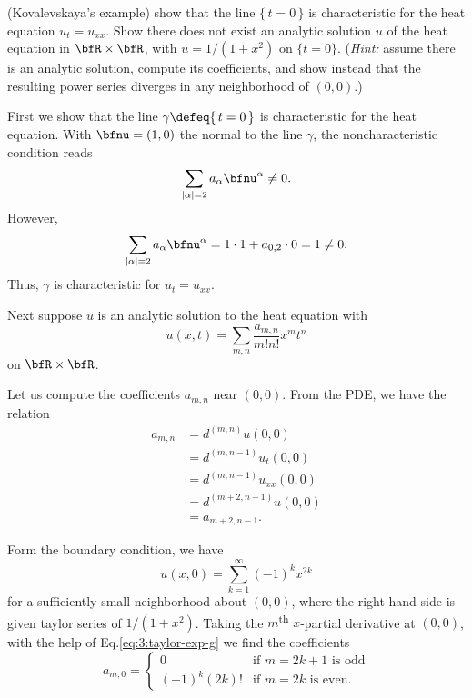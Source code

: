 \begin{problem}
  (Kovalevskaya's example) show that the line \(\{\,t=0\,\}\) is
  characteristic for the heat equation \(u_t=u_{xx}\). Show there does not
  exist an analytic solution \(u\) of the heat equation in
  \(\bfR\times\bfR\), with \(u=1/(1+x^2)\) on \(\{t=0\}\). (\emph{Hint:}
  assume there is an analytic solution, compute its coefficients, and show
  instead that the resulting power series diverges in any neighborhood of
  \((0,0)\).)
\end{problem}
\begin{solution}
  First we show that the line \(\gamma\defeq\{\,t=0\,\}\) is characteristic
  for the heat equation. With \(\bfnu=(1,0)\) the normal to the line
  \(\gamma\), the noncharacteristic condition reads
  \[
    \sum_{|\alpha|=2} a_\alpha\bfnu^\alpha\neq 0.
  \]
  However,
  \[
    \sum_{|\alpha|=2} a_\alpha\bfnu^\alpha=%
    1\cdot 1+a_{0,2}\cdot 0=%
    1\neq%
    0.
  \]
  Thus, \(\gamma\) is characteristic for \(u_t=u_{xx}\).

  Next suppose \(u\) is an analytic solution to the heat equation with
  \[
    u(x,t)=\sum_{m,n} \frac{a_{m,n}}{m!n!}x^mt^n
  \]
  on \(\bfR\times\bfR\).

  Let us compute the coefficients \(a_{m,n}\) near \((0,0)\). From the PDE,
  we have the relation
  \begin{equation}
    \label{eq:3:pde-relation}
    \begin{aligned}
      a_{m,n}
      &=d^{(m,n)} u(0,0)\\
      &=d^{(m,n-1)}u_t(0,0)\\
      &=d^{(m,n-1)}u_{xx}(0,0)\\
      &=d^{(m+2,n-1)}u(0,0)\\
      &=a_{m+2,n-1}.
    \end{aligned}
  \end{equation}

  Form the boundary condition, we have
  \begin{equation}
    \label{eq:3:taylor-exp-g}
    u(x,0)=\sum_{k=1}^\infty (-1)^k x^{2k}
  \end{equation}
  for a sufficiently small neighborhood about \((0,0)\), where the
  right-hand side is given taylor series of \(1/(1+x^2)\). Taking the
  \(m\)\textsuperscript{th} \(x\)-partial derivative at \((0,0)\), with the
  help of Eq.\@ \eqref{eq:3:taylor-exp-g} we find the coefficients
  \begin{equation}
    \label{eq:3:boundary-relation}
    a_{m,0}=
    \begin{cases}
      0&\text{if \(m=2k+1\) is odd}\\
      (-1)^k(2k)!&\text{if \(m=2k\) is even.}
    \end{cases}
  \end{equation}


\end{solution}

